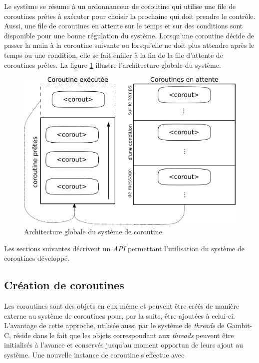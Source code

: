 \documentclass[12pt,oneside,letterpaper,francais]{book}
\begin{document}
Le système se résume à un ordonnanceur de coroutine qui utilise une
file de coroutines prêtes à exécuter pour choisir la prochaine qui
doit prendre le contrôle. Aussi, une file de coroutines en attente sur
le temps et sur des conditions sont disponible pour une bonne
régulation du système. Lorsqu'une coroutine décide de passer la main à
la coroutine suivante ou lorsqu'elle ne doit plus attendre après le
temps ou une condition, elle se fait enfiler à la fin de la file
d'attente de coroutines prêtes. La figure \ref{Corout:system-schema}
illustre l'architecture globale du système.

\begin{figure}[htb!]
  \center
  \includegraphics[scale=0.7]{corout-system}
  \caption{Architecture globale du système de coroutine}
  \label{Corout:system-schema}
\end{figure}

 Les sections suivantes décrivent un \textit{API} permettant
l'utilisation du système de coroutines développé.


\subsection{Création de coroutines}
Les coroutines sont des objets en eux même et peuvent être créés de
manière externe au système de coroutines pour, par la suite, être
ajoutées à celui-ci. L'avantage de cette approche, utilisée aussi par
le système de \textit{threads} de Gambit-C, réside dans le fait que
les objets correspondant aux \textit{threads} peuvent être initialisés
à l'avance et conservés jusqu'au moment opportun de leurs ajout au
système. Une nouvelle instance de coroutine s'effectue avec
\end{document}
